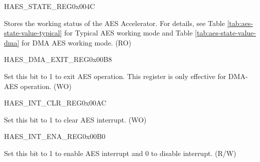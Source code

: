 \begin{register}{H}{AES\_STATE\_REG}{0x{}004C}\label{regdesc:AESSTATEREG}
%
%
\regnewline%
\begin{regdesc}\begin{reglist}
\item [AES\_STATE] Stores the working status of the AES Accelerator. For details, see Table \ref{tab:aes-state-value-typical} for Typical AES working mode and Table  \ref{tab:aes-state-value-dma} for DMA AES working mode. (RO)
\end{reglist}\end{regdesc}
\end{register}


\begin{register}{H}{AES\_DMA\_EXIT\_REG}{0x{}00B8}\label{regdesc:AESDMAEXITREG}
%
%
\regnewline%
\begin{regdesc}\begin{reglist}
\item [AES\_DMA\_EXIT] Set this bit to 1 to exit AES operation. This register is only effective for DMA-AES operation. (WO)
\end{reglist}\end{regdesc}
\end{register}


\begin{register}{H}{AES\_INT\_CLR\_REG}{0x{}00AC}\label{regdesc:AESINTCLRREG}
%
%
\regnewline%
\begin{regdesc}\begin{reglist}
\item [AES\_INT\_CLR] Set this bit to 1 to clear AES interrupt. (WO)
\end{reglist}\end{regdesc}
\end{register}


\begin{register}{H}{AES\_INT\_ENA\_REG}{0x{}00B0}\label{regdesc:AESINTENAREG}
%
%
\regnewline%
\begin{regdesc}\begin{reglist}
\item [AES\_INT\_ENA] Set this bit to 1 to enable AES interrupt and 0 to disable interrupt. (R/W)
\end{reglist}\end{regdesc}
\end{register}
